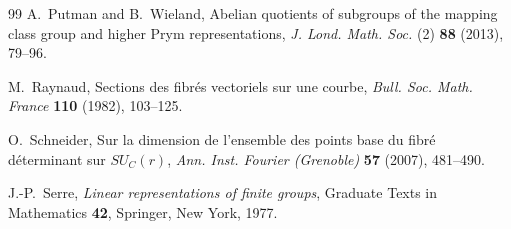 \documentclass[11pt,reqno]{amsart}
\numberwithin{equation}{section}
\theoremstyle{remark}
\begin{document}
\begin{thebibliography}{99}
A.~Putman and B.~Wieland,
Abelian quotients of subgroups of the mapping class group and higher
Prym representations,
\emph{J. Lond. Math. Soc.} (2) \textbf{88} (2013), 79--96.

M.~Raynaud,
Sections des fibr\'es vectoriels sur une courbe,
\emph{Bull. Soc. Math. France} \textbf{110} (1982), 103--125.

O.~Schneider,
Sur la dimension de l'ensemble des points base du fibr\'e d\'eterminant
sur \(SU_C(r)\),
\emph{Ann. Inst. Fourier (Grenoble)} \textbf{57} (2007), 481--490.

J.-P.~Serre,
\emph{Linear representations of finite groups},
Graduate Texts in Mathematics \textbf{42}, Springer, New York, 1977.

\end{thebibliography}
\end{document}

